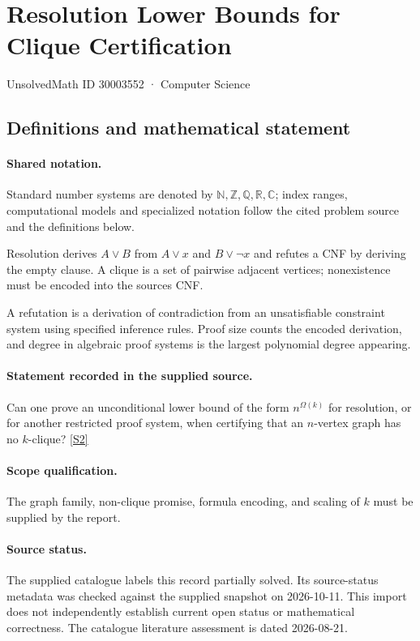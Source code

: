 \documentclass[11pt]{article}
\newcommand{\sref}[2]{\hyperlink{source:#1:#2}{[S#2]}}
\begin{document}
\setcounter{section}{30003551}
\section{Resolution Lower Bounds for Clique Certification}\label{30003552}
{\small\sffamily UnsolvedMath ID 30003552 · Computer Science}
\subsection{Definitions and mathematical statement}

\paragraph{Shared notation.}Standard number systems are denoted by $\mathbb N,\mathbb Z,\mathbb Q,\mathbb R,\mathbb C$; index ranges, computational models and specialized notation follow the cited problem source and the definitions below.


Resolution derives $A\lor B$ from $A\lor x$ and $B\lor\neg x$ and refutes a CNF by deriving the empty clause. A clique is a set of pairwise adjacent vertices; nonexistence must be encoded into the source\textquotesingle s CNF.

A refutation is a derivation of contradiction from an unsatisfiable constraint system using specified inference rules. Proof size counts the encoded derivation, and degree in algebraic proof systems is the largest polynomial degree appearing.
\paragraph{Statement recorded in the supplied source.}
Can one prove an unconditional lower bound of the form $n^{\Omega(k)}$ for resolution, or for another restricted proof system, when certifying that an $n$-vertex graph has no $k$-clique? \sref{30003552}{2}
\paragraph{Scope qualification.}
The graph family, non-clique promise, formula encoding, and scaling of $k$ must be supplied by the report.
\paragraph{Source status.}
The supplied catalogue labels this record partially solved. Its source-status metadata was checked against the supplied snapshot on 2026-10-11. This import does not independently establish current open status or mathematical correctness. The catalogue literature assessment is dated 2026-08-21.
\end{document}
